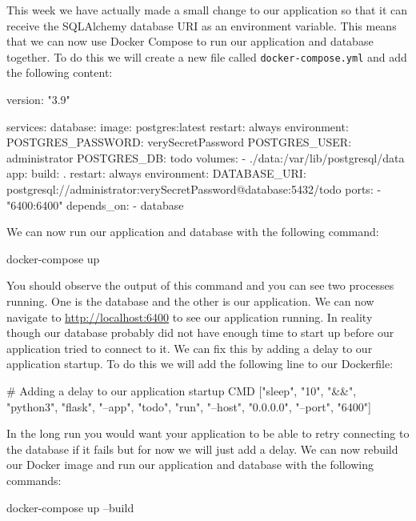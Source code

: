 \documentclass{csse4400}
\begin{document}
This week we have actually made a small change to our application so that it can receive the SQLAlchemy database URI as an environment variable. This means that we can now use Docker Compose to run our application and database together. To do this we will create a new file called \texttt{docker-compose.yml} and add the following content:

\begin{code}[numbers=none]{}
  version: "3.9"

  services:
    database:
      image: postgres:latest
      restart: always
      environment:
        POSTGRES_PASSWORD: verySecretPassword
        POSTGRES_USER: administrator
        POSTGRES_DB: todo
      volumes:
        - ./data:/var/lib/postgresql/data
    app:
      build: .
      restart: always
      environment:
        DATABASE_URI: postgresql://administrator:verySecretPassword@database:5432/todo
      ports:
        - "6400:6400"
      depends_on:
        - database
\end{code}

We can now run our application and database with the following command:

\begin{code}[language=bash,numbers=none]{}
  docker-compose up
\end{code}

You should observe the output of this command and you can see two processes running. One is the database and the other is our application. We can now navigate to \url{http://localhost:6400} to see our application running. In reality though our database probably did not have enough time to start up before our application tried to connect to it. We can fix this by adding a delay to our application startup. To do this we will add the following line to our Dockerfile:

\begin{code}[language=docker,numbers=none]{}
  # Adding a delay to our application startup
  CMD ["sleep", "10", "&&", "python3", "flask", "--app", "todo", "run", "--host", "0.0.0.0", "--port", "6400"]
\end{code}

In the long run you would want your application to be able to retry connecting to the database if it fails but for now we will just add a delay. We can now rebuild our Docker image and run our application and database with the following commands:

\begin{code}[language=bash,numbers=none]{}
  docker-compose up --build
\end{code}
\end{document}
